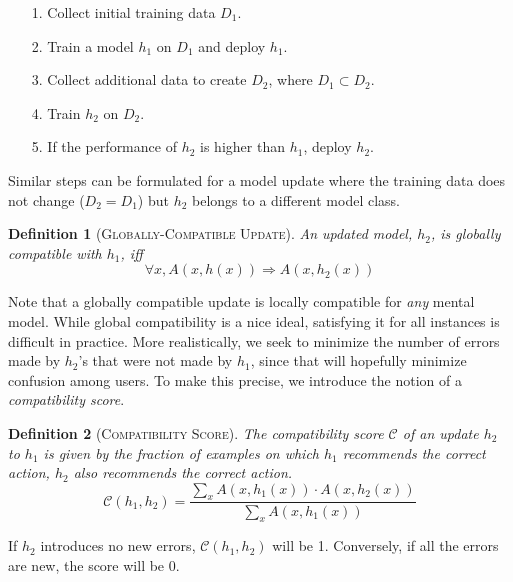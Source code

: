 \documentclass[letterpaper]{article}
\newtheorem*{definition}{Definition}
\newcommand{\hone}{\mbox{$h_1$}}
\newcommand{\htwo}{\mbox{$h_2$}}
\newcommand{\dtrainone}{\mbox{$D_1$}}
\newcommand{\dtraintwo}{\mbox{$D_2$}}
\newcommand{\compatscore}{\mathcal{C}}
\begin{document}
\begin{itemize}
    \item[1.] Collect initial training data $\dtrainone$.
    \item[2.] Train a model $\hone$ on $\dtrainone$ and deploy $\hone$.
    \item[3.] Collect additional data to create $\dtraintwo$, where $\dtrainone \subset \dtraintwo$.
    \item[4.] Train $\htwo$ on $\dtraintwo$.
    \item[5.] If the performance of $\htwo$ is higher than $\hone$, deploy $\htwo$.
\end{itemize}
Similar steps can be formulated for a model update where the training data does not change ($\dtraintwo=\dtrainone$) but $\htwo$ belongs to a different model class. 
\begin{definition}[\textsc{Globally-Compatible Update}]
An updated model, \htwo,  is globally compatible with \hone, iff
\[\forall x, A(x, h(x))\Rightarrow A(x, \htwo(x)) \]
\end{definition}

Note that a globally compatible update is locally compatible for {\em any} mental model.  While global compatibility is a nice ideal, satisfying it for all instances is difficult in practice. More realistically, we seek to minimize the number of errors made by \htwo's that were not made by $\hone$, since that will hopefully minimize confusion among users. 
To make this precise, we introduce the notion of a {\em compatibility score}. 

\begin{definition} [\textsc{Compatibility Score}]   
The compatibility score $\compatscore$ of an update $\htwo$ to $\hone$ is given by the fraction of examples on which $\hone$ recommends the correct action, $\htwo$ also recommends the correct action.
\begin{equation}
\label{eq:score}
    \compatscore(\hone, \htwo) =  \frac{\sum_{x}A(x, \hone(x)) \cdot A(x, \htwo(x))}{\sum_{x }A(x, \hone(x))}
\end{equation}
\end{definition}
If $\htwo$ introduces no new errors, $\compatscore(\hone, \htwo)$ will be 1. Conversely, if all the errors are new, the score will be 0. 
\end{document}
